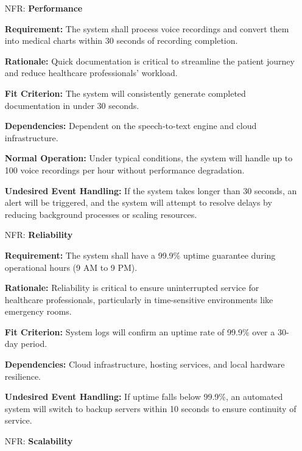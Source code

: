 \documentclass[12pt]{article}
\newcounter{nfrnum} %
\begin{document}
\noindent \begin{itemize}

\item[NFR\refstepcounter{nfrnum}\thenfrnum \label{NFR_Performance}:] \textbf{Performance}  
    
    \textbf{Requirement:} The system shall process voice recordings and convert them into medical charts within 30 seconds of recording completion.  
  
    \textbf{Rationale:} Quick documentation is critical to streamline the patient journey and reduce healthcare professionals' workload.  
  
    \textbf{Fit Criterion:} The system will consistently generate completed documentation in under 30 seconds.  
  
    \textbf{Dependencies:} Dependent on the speech-to-text engine and cloud infrastructure.  
  
    \textbf{Normal Operation:} Under typical conditions, the system will handle up to 100 voice recordings per hour without performance degradation.  
  
    \textbf{Undesired Event Handling:} If the system takes longer than 30 seconds, an alert will be triggered, and the system will attempt to resolve delays by reducing background processes or scaling resources.

\item[NFR\refstepcounter{nfrnum}\thenfrnum \label{NFR_Reliability}:] \textbf{Reliability}  

    \textbf{Requirement:} The system shall have a 99.9\% uptime guarantee during operational hours (9 AM to 9 PM).  
  
    \textbf{Rationale:} Reliability is critical to ensure uninterrupted service for healthcare professionals, particularly in time-sensitive environments like emergency rooms.  
  
    \textbf{Fit Criterion:} System logs will confirm an uptime rate of 99.9\% over a 30-day period.  
  
    \textbf{Dependencies:} Cloud infrastructure, hosting services, and local hardware resilience.  
  
    \textbf{Undesired Event Handling:} If uptime falls below 99.9\%, an automated system will switch to backup servers within 10 seconds to ensure continuity of service.

\item[NFR\refstepcounter{nfrnum}\thenfrnum \label{NFR_Scalability}:] \textbf{Scalability}  


\end{itemize}
\end{document}
